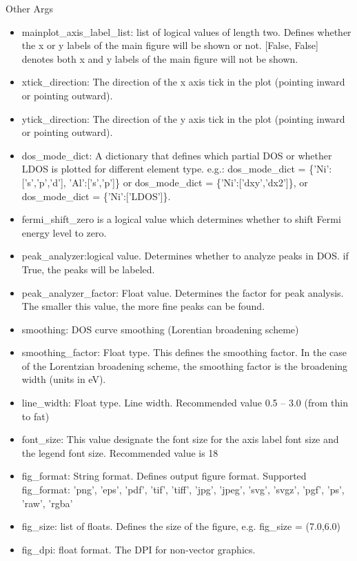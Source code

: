 \documentclass[12pt]{book}
\begin{document}
Other Args
\begin{itemize}
\item mainplot\_axis\_label\_list: list of logical values of length two. Defines whether the x or y labels of the main figure will be shown or not. [False, False] denotes both x and y labels of the main figure will not be shown. 
\item xtick\_direction: The direction of the x axis tick in the plot (pointing inward or pointing outward).
\item ytick\_direction: The direction of the y axis tick in the plot (pointing inward or pointing outward).
\item dos\_mode\_dict:  A dictionary that defines which partial DOS or whether LDOS is plotted for different element type. e.g.: dos\_mode\_dict = \{'Ni':['s','p','d'], 'Al':['s','p']\} or dos\_mode\_dict = \{'Ni':['dxy','dx2']\}, or dos\_mode\_dict = \{'Ni':['LDOS']\}.
\item fermi\_shift\_zero is a logical value which determines whether to shift Fermi energy level to zero.
\item peak\_analyzer:logical value. Determines whether to analyze peaks in DOS. if True, the peaks will be labeled.
\item peak\_analyzer\_factor: Float value. Determines the factor for peak analysis. The smaller this value, the more fine peaks can be found.
\item smoothing: DOS curve smoothing (Lorentian broadening scheme)
\item smoothing\_factor: Float type. This defines the smoothing factor. In the case of the Lorentzian broadening scheme, the smoothing factor is the broadening width (units in eV).
\item line\_width: Float type. Line width. Recommended value 0.5 -- 3.0 (from thin to fat)
\item font\_size: This value designate the font size for the axis label font size and the legend font size. Recommended value is 18
\item fig\_format: String format. Defines output figure format. Supported fig\_format: 'png', 'eps', 'pdf', 'tif', 'tiff', 'jpg', 'jpeg', 'svg', 'svgz', 'pgf', 'ps', 'raw', 'rgba'
\item fig\_size: list of floats. Defines the size of the figure, e.g. fig\_size = (7.0,6.0)
\item fig\_dpi: float format. The DPI for non-vector graphics.
\end{itemize}
\end{document}
